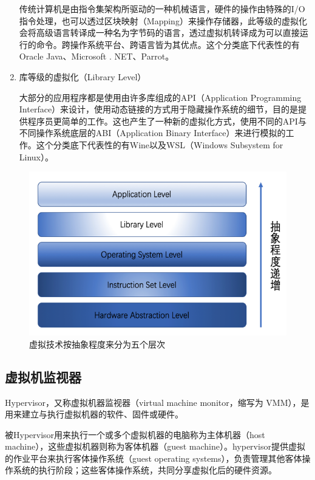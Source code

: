 \begin{enumerate}
    传统计算机是由指令集架构所驱动的一种机械语言，硬件的操作由特殊的I/O指令处理，也可以透过区块映射（Mapping）来操作存储器，此等级的虚拟化会将高级语言转译成一种名为字节码的语言，透过虚拟机转译成为可以直接运行的命令。跨操作系统平台、跨语言皆为其优点。这个分类底下代表性的有Oracle Java、Microsoft . NET、Parrot。
    \item 库等级的虚拟化（Library Level）

    大部分的应用程序都是使用由许多库组成的API（Application Programming Interface）来设计，使用动态链接的方式用于隐藏操作系统的细节，目的是提供程序员更简单的工作。这也产生了一种新的虚拟化方式，使用不同的API与不同操作系统底层的ABI（Application Binary Interface）来进行模拟的工作。这个分类底下代表性的有Wine以及WSL（Windows Subsystem for Linux）。
\end{enumerate}

\begin{figure}[htb]
  \centering
  \includegraphics{./Figure/IMG_Chap2_1.png}
  \caption{虚拟技术按抽象程度来分为五个层次}\label{Fig:chap2_1}
\end{figure}

\subsection{虚拟机监视器}
Hypervisor，又称虚拟机器监视器（virtual machine monitor，缩写为 VMM），是用来建立与执行虚拟机器的软件、固件或硬件。

被Hypervisor用来执行一个或多个虚拟机器的电脑称为主体机器（host machine），这些虚拟机器则称为客体机器（guest machine）。hypervisor提供虚拟的作业平台来执行客体操作系统（guest operating systems），负责管理其他客体操作系统的执行阶段；这些客体操作系统，共同分享虚拟化后的硬件资源。

